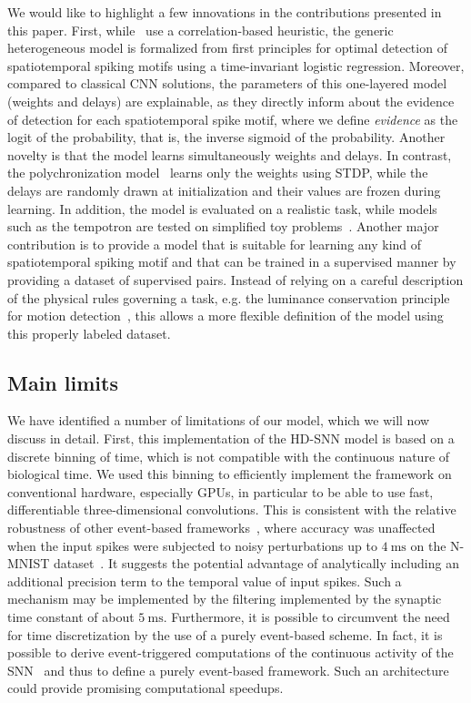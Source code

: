 \documentclass[default]{sn-jnl}%
\theoremstyle{thmstyleone}%
\theoremstyle{thmstyletwo}%
\theoremstyle{thmstylethree}%
\newcommand{\ms}{\si{\milli\second}}%
\begin{document}
We would like to highlight a few innovations in the contributions presented in this paper. First, while~\citep{ghosh_spatiotemporal_2019,yu_stsc-snn_2022} use a correlation-based heuristic, the generic heterogeneous model is formalized from first principles for optimal detection of spatiotemporal spiking motifs using a time-invariant logistic regression. Moreover, compared to classical CNN solutions, the parameters of this one-layered model (weights and delays) are explainable, as they directly inform about the evidence  of detection for each spatiotemporal spike motif, where we define \emph{evidence} as the logit of the probability, that is, the inverse sigmoid of the probability. Another novelty is that the model learns simultaneously weights and delays. In contrast, the polychronization model~\citep{izhikevich_polychronization_2006} learns only the weights using STDP, while the delays are randomly drawn at initialization and their values are frozen during learning. In addition, the model is evaluated on a realistic task, while models such as the tempotron are tested on simplified toy problems~\citep{gutig_tempotron_2006}. Another major contribution is to provide a model that is suitable for learning any kind of spatiotemporal spiking motif and that can be trained in a supervised manner by providing a dataset of supervised pairs. Instead of relying on a careful description of the physical rules governing a task, e.g. the luminance conservation principle for motion detection~\citep{benosman_asynchronous_2012, dardelet_event-by-event_2021}, this allows a more flexible definition of the model using this properly labeled dataset.
%
\subsection{Main limits} 
We have identified a number of limitations of our model, which we will now discuss in detail. First, this implementation of the HD-SNN model is based on a discrete binning of time, which is not compatible with the continuous nature of biological time. We used this binning to efficiently implement the framework on conventional hardware, especially GPUs, in particular to be able to use fast, differentiable three-dimensional convolutions. This is consistent with the relative robustness of other event-based frameworks~\citep{lagorce_hots_2017,grimaldi_robust_2022}, where accuracy was unaffected when the input spikes were subjected to noisy perturbations up to $4~\ms$ on the N-MNIST dataset~\citep{grimaldi_robust_2022}. It suggests the potential advantage of analytically including an additional precision term to the temporal value of input spikes. Such a mechanism may be implemented by the filtering implemented by the synaptic time constant of about $5~\ms$. Furthermore, it is possible to circumvent the need for time discretization by the use of a purely event-based scheme. In fact, it is possible to derive event-triggered computations of the continuous activity of the SNN~\citep{hanuschkin_general_2010} and thus to define a purely event-based framework. Such an architecture could provide promising computational speedups.
\end{document}
